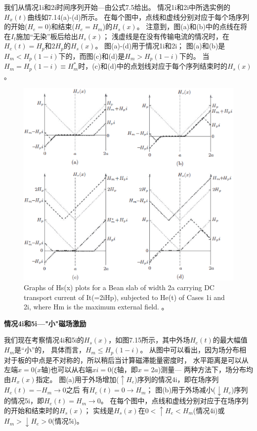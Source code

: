 我们从情况1i和2i时间序列开始---由公式7.5给出。
情况1i和2i中所选实例的$H_x(t)$曲线如7.14(a)-(d)所示。
在每个图中，点线和虚线分别对应于每个场序列的开始($H_e = 0$)和结束($H_e = H_m$)的$H_s(x)$。
注意到，图(a)和(b)中的点线在将在$I_t$施加“无染”板后给出$H_s(x)$；
浅虚线是在没有传输电流的情况时，在$H_e(t)=H_p$和$2H_p$的$H_s(x)$。
图(a)-(d)用于情况1i和2i； 图(a)和(b)是$H_m<H_p(1-i)$下的，而图(c)和(d)是$H_m> H_p(1-i)$下的。
当$H_m = H_p(1-i)\equiv H_m^*$时，(c)和(d)中的点划线对应于每个序列结束时的$H_s(x)$。
\begin{figure}[htbp]
	\centering
	\includegraphics[scale=0.7]{chpt7/figs/fig7.14.eps}
	\caption{Graphs of Hs(x) plots for a Bean slab of width 2a carrying DC transport
		current of It(=2iHp), subjected to He(t) of Cases 1i and 2i, where Hm is the maximum
		external field. 。}
\end{figure}

\textbf{情况4i和5i---"小"磁场激励}

我们现在考察情况4i和5i的$H_s(x)$，如图7.15所示，其中外场$H_e(t)$的最大幅值$H_m$是“小”的，
具体而言，$H_m\le H_p(1-i)$。
从图中可以看出，因为场分布相对于板的中点是不对称的，所以稍后当计算磁滞能量密度时，
水平距离是可以从左端$x = 0$($x$轴)也可以从右端$xi= 0$($\xi$轴，即$x=2a$)测量---
两种方法下，场分布均由$H_x(x)$指定。
图(a)用于外场增加($\uparrow H_e$)序列的情况4i，即在场序列$H_e(t)=-H_m\rightarrow 0$之后
有$H_e(t)= 0\rightarrow H_m$；
图(b)用于外场减小($\downarrow H_e$)序列的情况5i，即$H_e(t)= H_m\rightarrow 0$。
在每个图中，点线和虚线分别对应于在场序列的开始和结束时的$H_s(x)$；
实线是$H_s(x)$在$0<\uparrow H_e<H_m$(情况4i)或$H_m>\downarrow H_e> 0$(情况5i)。


